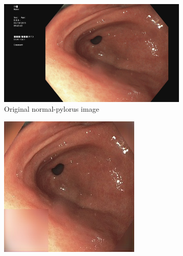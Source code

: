     
        \begin{figure}[h]
        \tiny
		\begin{subfigure}[t]{\myfigsizethree}
            \centering
            \includegraphics[height=\textwidth ,width=\textwidth]{experiments/figures/both/NPORIG.jpg}
            \caption{Original normal-pylorus image}    
            \label{fig:np_ORIG_both1}
        \end{subfigure}
        \qquad
        \begin{subfigure}[t]{\myfigsizethree}
            \centering
            \includegraphics[width=\textwidth]{experiments/figures/both/NPAE.jpg}

\end{subfigure}
\end{figure}
